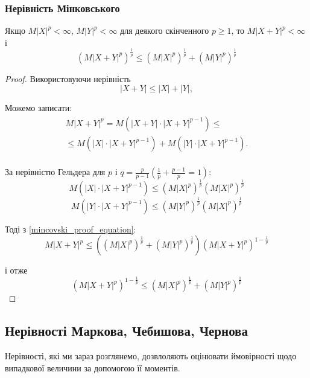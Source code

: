 \subsubsection{Нерівність Мінковського}

\begin{theorem}
    Якщо $M|X|^p < \infty$, $M|Y|^p < \infty$ для
    деякого скінченного $p \geqslant 1$, то
    $M|X + Y|^p < \infty$ і
    \begin{equation}
        (M|X+Y|^p)^{\frac{1}{p}} \leqslant (M|X|^p)^{\frac{1}{p}} + (M|Y|^p)^{\frac{1}{p}}
    \end{equation}
\end{theorem}
\begin{proof}
    Використовуючи нерівність
    $$|X+Y| \leqslant |X| + |Y|,$$

    Можемо записати:
    \begin{equation}
        \label{mincovski_proof_equation}
        \begin{array}{c}
            M|X+Y|^p = M(|X+Y| \cdot |X+Y|^{p-1}) \leqslant \\
            \leqslant M(|X| \cdot |X+Y|^{p-1}) + M(|Y| \cdot |X+Y|^{p-1}). \\   
        \end{array}
    \end{equation}

    За нерівністю Гельдера для $p$ і
    $q = \frac{p}{p-1}(\frac{1}{p} + \frac{p-1}{p} = 1)$:
    $$M(|X| \cdot |X+Y|^{p-1}) \leqslant (M|X|^p)^{\frac{1}{p}} (M|X|^p)^{\frac{1}{p}}$$
    $$M(|Y| \cdot |X+Y|^{p-1}) \leqslant (M|Y|^p)^{\frac{1}{p}} (M|X|^p)^{\frac{1}{p}}$$

    Тоді з \ref{mincovski_proof_equation}:
    $$M|X+Y|^p \leqslant ((M|X|^p)^{\frac{1}{p}} + (M|Y|^p)^{\frac{1}{p}})(M|X+Y|^p)^{1-\frac{1}{p}}$$

    і отже
    $$(M|X+Y|^p)^{1-\frac{1}{p}} \leqslant (M|X|^p)^{\frac{1}{p}} + (M|Y|^p)^{\frac{1}{p}}$$
\end{proof}

\subsection{Нерівності Маркова, Чебишова, Чернова}

Нерівності, які ми зараз розглянемо, дозвлоляють
оцінювати ймовірності щодо
випадкової величини за допомогою її моментів.

